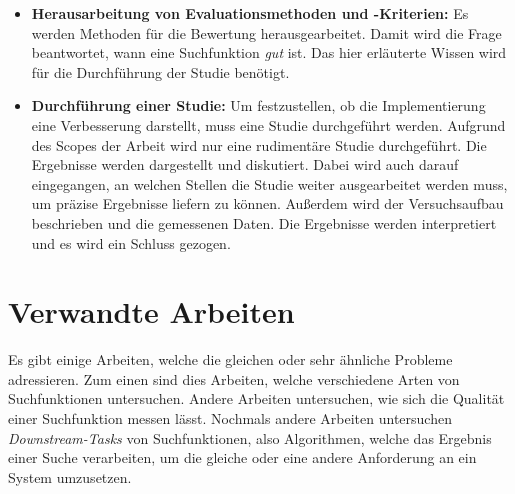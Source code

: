 \begin{itemize}
         Es wird die Weaviate\footnote{https://weaviate.io/} Vektordatenbank verwendet, um Dokumente zu indizieren.
   \item \textbf{Herausarbeitung von Evaluationsmethoden und -Kriterien:}
         Es werden Methoden für die Bewertung herausgearbeitet.
         Damit wird die Frage beantwortet, wann eine Suchfunktion \textit{gut} ist.
         Das hier erläuterte Wissen wird für die Durchführung der Studie benötigt.
   \item \textbf{Durchführung einer Studie:}
         Um festzustellen, ob die Implementierung eine Verbesserung darstellt, muss eine Studie durchgeführt werden.
         Aufgrund des Scopes der Arbeit wird nur eine rudimentäre Studie durchgeführt.
         Die Ergebnisse werden dargestellt und diskutiert.
         Dabei wird auch darauf eingegangen, an welchen Stellen die Studie weiter ausgearbeitet werden muss, um präzise Ergebnisse liefern zu können.
         Außerdem wird der Versuchsaufbau beschrieben und die gemessenen Daten.
         Die Ergebnisse werden interpretiert und es wird ein Schluss gezogen.
\end{itemize}

\section{Verwandte Arbeiten}
Es gibt einige Arbeiten, welche die gleichen oder sehr ähnliche Probleme adressieren.
Zum einen sind dies Arbeiten, welche verschiedene Arten von Suchfunktionen untersuchen.
Andere Arbeiten untersuchen, wie sich die Qualität einer Suchfunktion messen lässt.
Nochmals andere Arbeiten untersuchen \textit{Downstream-Tasks} von Suchfunktionen, also Algorithmen, welche das Ergebnis einer Suche verarbeiten, um die gleiche oder eine andere Anforderung an ein System umzusetzen.\\

